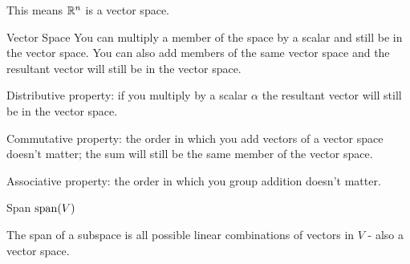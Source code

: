 \documentclass[11pt]{article}
\begin{document}
This means $\mathbb R^n$ is a vector space.




\begin{definition}{Vector Space}
You can multiply a member of the space by a scalar and still be in the vector space.
You can also add members of the same vector space and the resultant vector will still be in the vector space.

Distributive property: if you multiply by a scalar $\alpha$ the resultant vector will still be in the vector space.

Commutative property: the order in which you add vectors of a vector space doesn't matter; the sum will still be the same member of the vector space.

Associative property: the order in which you group addition doesn't matter.
\end{definition}


\begin{definition}{Span}
  $\operatorname{span}(V)$

  The span of a subspace is all possible linear combinations of vectors in $V$ - also a vector space.
\end{definition}
\end{document}
